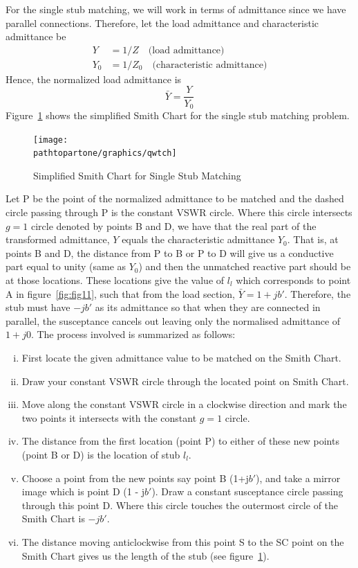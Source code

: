 For the single stub matching, we will work in terms of admittance since we have parallel connections. Therefore, let the load admittance and characteristic admittance be
\begin{align*}
Y &= 1/Z\quad\text{(load admittance)}\\
Y_0 &= 1/Z_0\quad\text{(characteristic admittance)}
\end{align*}
Hence, the normalized load admittance is
\begin{equation*} 
\bar{Y}=\frac{Y}{Y_0} 
\end{equation*}
Figure~\ref{fig:qwtch} shows the simplified Smith Chart for the single stub matching problem.
\begin{figure}[h]
\centering
\texttt{[image: \\pathtopartone/graphics/qwtch]}
\caption{Simplified Smith Chart for Single Stub Matching}
\label{fig:qwtch}
\end{figure}
Let P be the point of the normalized admittance to be matched and the dashed circle passing through P is the constant VSWR circle. Where this circle intersects $g = 1$ circle denoted by points B and D, we have that the real part of the transformed admittance, $Y$ equals the characteristic admittance $Y_0$. That is, at points B and D, the distance from P to B or P to D will give us a conductive part equal to unity (same as $Y_0$) and then the unmatched reactive part should be at those locations. These locations give the value of $l_l$ which corresponds to point A in figure~\ref{fig:fig11}, such that from the load section, $\bar{Y} = 1 + jb'$. Therefore, the stub must have $-jb'$ as its admittance so that when they are connected in parallel, the susceptance cancels out leaving only the normalised admittance of $1 + j0$. The process involved is summarized as follows:
\begin{enumerate}[(i)]
\item First locate the given admittance value to be matched on the Smith Chart.
\item Draw your constant VSWR circle through the located point on Smith Chart.
\item Move along the constant VSWR circle in a clockwise direction and mark the two points it intersects with the constant $g = 1$ circle.
\item The distance from the first location (point P) to either of these new points (point B or D) is the location of stub $l_l$.
\item Choose a point from the new points say point B (1+j$b'$), and take a mirror image which is point D (1 - j$b'$). Draw a constant susceptance circle passing through this point D. Where this circle touches the outermost circle of the Smith Chart is $-jb'$.
\item The distance moving anticlockwise from this point S to the SC point on the Smith Chart gives us the length of the stub (see figure~\ref{fig:qwtch}).
\end{enumerate}

